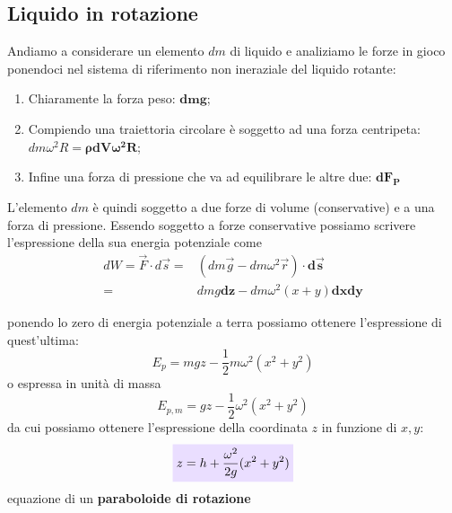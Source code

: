 \documentclass[x11names]{article}
\newcommand{\viola}[1]{\colorbox{yred}{$\displaystyle #1$}}
\begin{document}
	\subsection{Liquido in rotazione}
	Andiamo a considerare un elemento \(dm\) di liquido e analiziamo le forze in gioco ponendoci nel sistema di riferimento non ineraziale del liquido rotante: 
	\begin{enumerate}
		\item Chiaramente la forza peso: \(\boldsymbol{dmg}\);
		\item Compiendo una traiettoria circolare è soggetto ad una forza centripeta: \(dm\omega^2R = \boldsymbol{\rho dV\omega^2 R}\);
		\item Infine una forza di pressione che va ad equilibrare le altre due: \(\boldsymbol{dF_{P}}\)
	\end{enumerate}
	L'elemento \(dm\) è quindi soggetto a due forze di volume (conservative) e a una forza di pressione. Essendo soggetto a forze conservative possiamo scrivere l'espressione della sua energia potenziale come
	\begin{align*}
		dW = \overrightarrow{F} \cdot d\vec{s} =& (dm \vec{g} - dm \omega^2 \vec{r}) \cdot \boldsymbol{d\vec{s}}\\
		   									   =& dmg\boldsymbol{dz} - dm \omega^2(x+y)\boldsymbol{dxdy}
	\end{align*} 
	\begin{minipage}{0.5\textwidth}
		ponendo lo zero di energia potenziale a terra possiamo ottenere l'espressione di quest'ultima:
		\[ 
		E_{p} = mgz - \frac{1}{2}m\omega ^2(x^2 + y^2)
		\]
		o espressa in unità di massa
		\[ 
		E_{p,m} = gz - \frac{1}{2}\omega ^2(x^2 + y^2)
		\]
		da cui possiamo ottenere l'espressione della coordinata \(z\) in funzione di \(x,y\):
		\begin{equation}
			\viola{z = h +\frac{\omega ^2}{2g}(x^2 +y^2)}
		\end{equation}
		equazione di un \textbf{paraboloide di rotazione}
	\end{minipage}
\end{document}

